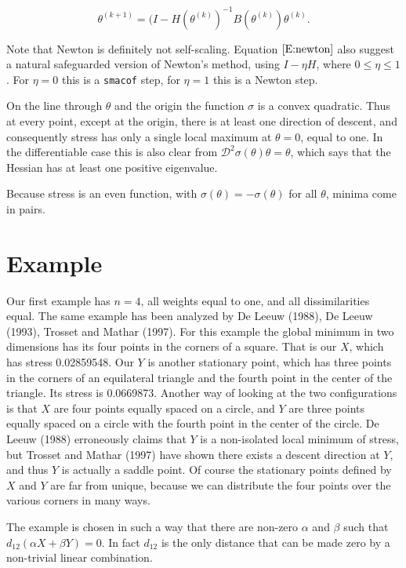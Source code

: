 \documentclass[12pt,]{article}
\begin{document}
\begin{equation}
\theta^{(k+1)}=(I-H(\theta^{(k)})^{-1}B(\theta^{(k)})\theta^{(k)}.\label{E:newton}
\end{equation}

Note that Newton is definitely not self-scaling. Equation
\(\eqref{E:newton}\) also suggest a natural safeguarded version of
Newton's method, using \(I-\eta H\), where \(0\leq\eta\leq 1\). For
\(\eta=0\) this is a \texttt{smacof} step, for \(\eta=1\) this is a
Newton step.

On the line through \(\theta\) and the origin the function \(\sigma\) is
a convex quadratic. Thus at every point, except at the origin, there is
at least one direction of descent, and consequently stress has only a
single local maximum at \(\theta=0\), equal to one. In the
differentiable case this is also clear from
\(\mathcal{D}^2\sigma(\theta)\theta=\theta\), which says that the
Hessian has at least one positive eigenvalue.

Because stress is an even function, with
\(\sigma(\theta)=-\sigma(\theta)\) for all \(\theta\), minima come in
pairs.

\section{Example}\label{example}

Our first example has \(n=4\), all weights equal to one, and all
dissimilarities equal. The same example has been analyzed by De Leeuw
(1988), De Leeuw (1993), Trosset and Mathar (1997). For this example the
global minimum in two dimensions has its four points in the corners of a
square. That is our \(X\), which has stress 0.02859548. Our \(Y\) is
another stationary point, which has three points in the corners of an
equilateral triangle and the fourth point in the center of the triangle.
Its stress is 0.0669873. Another way of looking at the two
configurations is that \(X\) are four points equally spaced on a circle,
and \(Y\) are three points equally spaced on a circle with the fourth
point in the center of the circle. De Leeuw (1988) erroneously claims
that \(Y\) is a non-isolated local minimum of stress, but Trosset and
Mathar (1997) have shown there exists a descent direction at \(Y\), and
thus \(Y\) is actually a saddle point. Of course the stationary points
defined by \(X\) and \(Y\) are far from unique, because we can
distribute the four points over the various corners in many ways.

The example is chosen in such a way that there are non-zero \(\alpha\)
and \(\beta\) such that \(d_{12}(\alpha X+\beta Y)=0\). In fact
\(d_{12}\) is the only distance that can be made zero by a non-trivial
linear combination.
\end{document}
